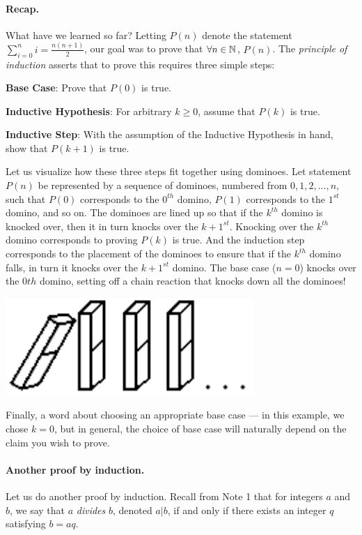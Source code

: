 \documentclass[11pt]{article}
\begin{document}
\paragraph{Recap.} What have we learned so far? Letting $P(n)$ denote the statement $\sum_{i=0}^{n} i = \frac{n(n+1)}{2}$, our goal was to prove that $\forall n \in \mathbb{N}$, $P(n)$. The {\em principle of induction}
asserts that to prove this requires three simple steps:
\begin{compactenum}
  \item \textbf{Base Case}: Prove that $P(0)$ is true.
  \item \textbf{Inductive Hypothesis}: For arbitrary $k\geq 0$, assume that $P(k)$ is true.
  \item \textbf{Inductive Step}: With the assumption of the Inductive Hypothesis in hand, show that $P(k+1)$ is true.
\end{compactenum}
Let us visualize how these three steps fit together using dominoes. Let statement $P(n)$ be represented by a sequence of dominoes, numbered from $0, 1, 2, ..., n$, such that $P(0)$ corresponds to the $0^{th}$ domino, $P(1)$ corresponds to the $1^{st}$ domino, and so on. The dominoes are lined up so that if the $k^{th}$ domino is knocked over, then it in turn knocks over the $k+1^{st}$.  Knocking over the $k^{th}$ domino corresponds to proving $P(k)$ is true. And the induction step corresponds to the placement of the dominoes to ensure that if the $k^{th}$ domino falls, in turn it knocks over the $k+1^{st}$ domino. The base case ($n=0$) knocks over the $0{th}$ domino, setting off a chain reaction that knocks down all the dominoes!

\begin{center}
\includegraphics[scale = 0.7]{induction}
\end{center}

Finally, a word about choosing an appropriate base case --- in this example, we chose $k=0$, but in general, the choice of base case will naturally depend on the claim you wish to prove.

\paragraph{Another proof by induction.} Let us do another proof by induction. Recall from Note 1 that for integers $a$ and $b$, we say that $a$ \emph{divides} $b$, denoted $a|b$, if and only if there exists an integer $q$ satisfying $b = aq$.
\end{document}
